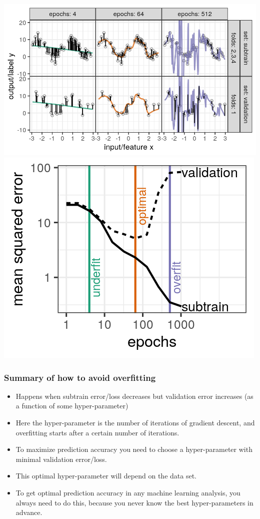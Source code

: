 \documentclass{beamer}
\begin{document}



\begin{frame}
  \centering
  \includegraphics[height=0.5\textheight]{figure-overfitting-paper}
  \includegraphics[height=0.45\textheight]{figure-overfitting-paper-loss}   
\end{frame}

\begin{frame}
  \frametitle{Summary of how to avoid overfitting}
  \begin{itemize}
  \item Happens when subtrain error/loss decreases but validation error
    increases (as a function of some hyper-parameter)
  \item Here the hyper-parameter is the number of iterations of
    gradient descent, and overfitting starts after a certain number of
    iterations.
  \item To maximize prediction accuracy you need to choose a
    hyper-parameter with minimal validation error/loss.
  \item This optimal hyper-parameter will depend on the data set.
  \item To get optimal prediction accuracy in any machine learning
    analysis, you always need to do this, because you never know the
    best hyper-parameters in advance.
  \end{itemize}
\end{frame}
\end{document}
